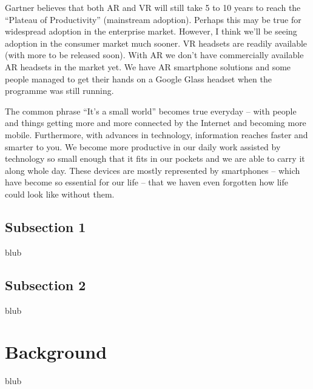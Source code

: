 Gartner believes that both AR and VR will still take 5 to 10 years to reach the “Plateau of Productivity” (mainstream adoption). Perhaps this may be true for widespread adoption in the enterprise market. However, I think we’ll be seeing adoption in the consumer market much sooner. VR headsets are readily available (with more to be released soon). With AR we don’t have commercially available AR headsets in the market yet. We have AR smartphone solutions and some people managed to get their hands on a Google Glass headset when the programme was still running.



The common phrase “It’s a small world” becomes true everyday – with people and things getting more and more connected by the Internet and becoming more mobile. Furthermore, with advances in technology, information reaches faster and smarter to you. We become more productive in our daily work assisted by technology so small enough that it fits in our pockets and we are able to carry it along whole day. These devices are mostly represented by smartphones – which have become so essential for our life – that we haven even forgotten how life could look like without them.


\subsection{Subsection 1}

blub



\subsection{Subsection 2}

blub



\section{Background}

blub



